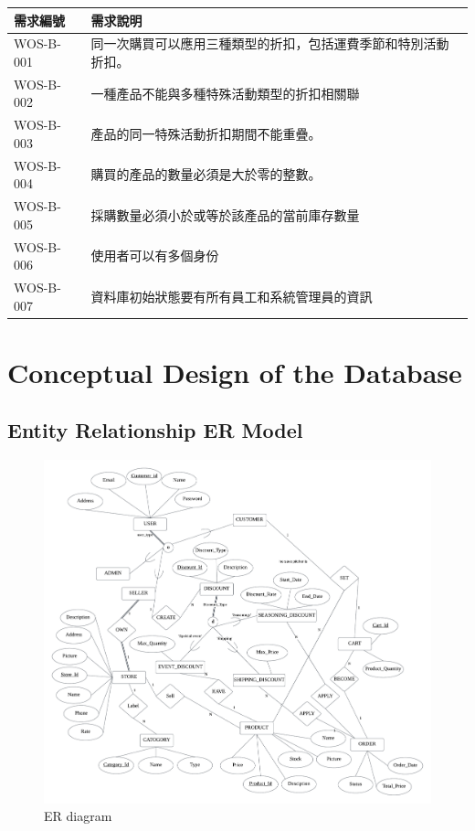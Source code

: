 \documentclass[a4paper, 12pt]{article}
\begin{document}
\noindent\begin{tabular}{ | p{6.5em} | p{32em} |}
\hline
需求編號 & 需求說明 \\ 
\hline
WOS-B-001 & 同一次購買可以應用三種類型的折扣，包括運費季節和特別活動折扣。\\
\hline
WOS-B-002 & 一種產品不能與多種特殊活動類型的折扣相關聯\\
\hline
WOS-B-003 & 產品的同一特殊活動折扣期間不能重疊。\\
\hline
WOS-B-004 & 購買的產品的數量必須是大於零的整數。\\
\hline
WOS-B-005 & 採購數量必須小於或等於該產品的當前庫存數量    \\
\hline
WOS-B-006 & 使用者可以有多個身份 \\
\hline
WOS-B-007 & 資料庫初始狀態要有所有員工和系統管理員的資訊 \\
\hline
\end{tabular}

\newpage

\section{Conceptual Design of the Database}
\subsection{Entity Relationship ER Model}

\begin{figure}[h]
    \centering
    \includegraphics[width=40em]{ER-diagram.png}
    \caption{ER diagram}
    \label{fig:enter-label}
\end{figure}
\end{document}
